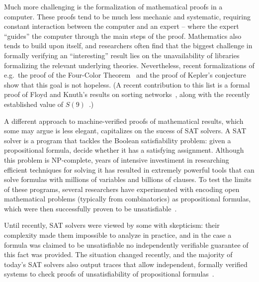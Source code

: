 Much more challenging is the formalization of mathematical proofs in a
computer. These proofs tend to be much less mechanic and systematic, requiring
constant interaction between the computer and an expert -- where the expert
``guides'' the computer through the main steps of the proof. Mathematics also
tends to build upon itself, and researchers often find that the biggest
challenge in formally verifying an ``interesting'' result lies on the
unavailability of libraries formalizing the relevant underlying theories.
Nevertheless, recent formalizations of e.g.~the proof of the Four-Color
Theorem~\cite{Gonthier2008} and the proof of Kepler's
conjecture~\cite{Hales2014a} show that this goal is not hopeless. (A recent
contribution to this list is a formal proof of Floyd and Knuth's results on
sorting networks~\cite{lcfEtAl2017a}, along with the recently established value
of $S(9)$~\cite{CodishEtAl2016}.)

A different approach to machine-verified proofs of mathematical results, which
some may argue is less elegant, capitalizes on the sucess of SAT solvers. A SAT
solver is a program that tackles the Boolean satisfiability problem: given a
propositional formula, decide whether it has a satisfying assignment. Although
this problem is NP-complete, years of intensive investiment in researching
efficient techniques for solving it has resulted in extremely powerful tools
that can solve formulas with millions of variables and billions of clauses. To
test the limits of these programs, several researchers have experimented with
encoding open mathematical problems (typically from combinatorics) as
propositional formulas, which were then successfully proven to be
unsatisfiable~\cite{HeuleKullmann2017}.

Until recently, SAT solvers were viewed by some with skepticism: their
complexity made them impossible to analyze in practice, and in the case a
formula was claimed to be unsatisfiable no independently verifiable guarantee of
this fact was provided. The situation changed recently, and the majority of
today's SAT solvers also output traces that allow independent, formally verified
systems to check proofs of unsatisfiability of propositional
formulas~\cite{lcfEtAl2017b,lcfEtAl2017c}.
